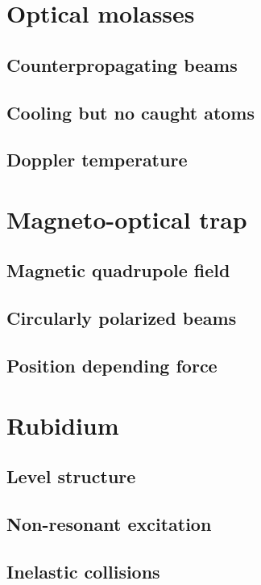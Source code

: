\documentclass[11pt, english, fleqn, DIV=15, headinclude, BCOR=2cm]{scrreprt}
\begin{document}
\section{Optical molasses}

\subsection{Counterpropagating beams}

\subsection{Cooling but no caught atoms}

\subsection{Doppler temperature}

\section{Magneto-optical trap}

\subsection{Magnetic quadrupole field}

\subsection{Circularly polarized beams}

\subsection{Position depending force}

\section{Rubidium}

\subsection{Level structure}

\subsection{Non-resonant excitation}

\subsection{Inelastic collisions}
\end{document}

